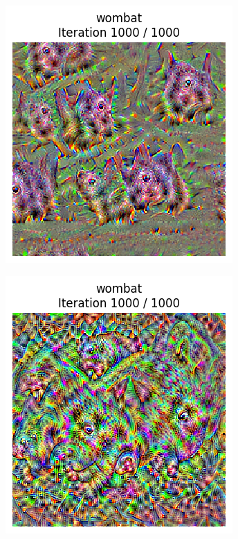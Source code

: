 \begin{figure}[H]
    \centering
    \begin{subfigure}{.32\textwidth}
        \centering
        \includegraphics[width=\linewidth]{SqueezeNet/wombat_animated_1000_last_frame.png}
        \caption{}
        \label{fig:class_viz_wombat_VGG:a}
    \end{subfigure}%
    \begin{subfigure}{.32\textwidth}
        \centering
        \includegraphics[width=\linewidth]{VGG/VGG_wombat_animated_1000_last_frame.png}

\end{subfigure}
\end{figure}
